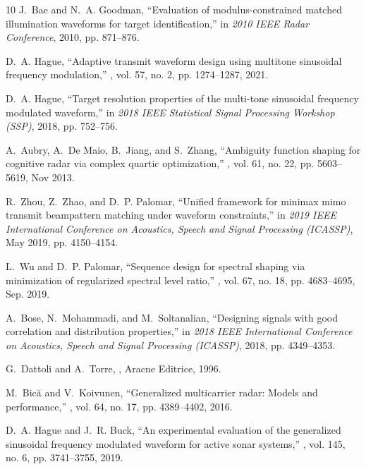 \documentclass{article}
\begin{document}
\begin{thebibliography}{10}
J.~{Bae} and N.~A. {Goodman},
\newblock ``Evaluation of modulus-constrained matched illumination waveforms
  for target identification,''
\newblock in {\em 2010 IEEE Radar Conference}, 2010, pp. 871--876.

D.~A. {Hague},
\newblock ``Adaptive transmit waveform design using multitone sinusoidal
  frequency modulation,''
, vol. 57,
  no. 2, pp. 1274--1287, 2021.

D.~A. {Hague},
\newblock ``Target resolution properties of the multi-tone sinusoidal frequency
  modulated waveform,''
\newblock in {\em 2018 IEEE Statistical Signal Processing Workshop (SSP)},
  2018, pp. 752--756.

A.~{Aubry}, A.~{De Maio}, B.~{Jiang}, and S.~{Zhang},
\newblock ``Ambiguity function shaping for cognitive radar via complex quartic
  optimization,''
, vol. 61, no. 22, pp.
  5603--5619, Nov 2013.

R.~{Zhou}, Z.~{Zhao}, and D.~P. {Palomar},
\newblock ``Unified framework for minimax mimo transmit beampattern matching
  under waveform constraints,''
\newblock in {\em 2019 IEEE International Conference on Acoustics, Speech and
  Signal Processing (ICASSP)}, May 2019, pp. 4150--4154.

L.~{Wu} and D.~P. {Palomar},
\newblock ``Sequence design for spectral shaping via minimization of
  regularized spectral level ratio,''
, vol. 67, no. 18, pp.
  4683--4695, Sep. 2019.

A.~{Bose}, N.~{Mohammadi}, and M.~{Soltanalian},
\newblock ``Designing signals with good correlation and distribution
  properties,''
\newblock in {\em 2018 IEEE International Conference on Acoustics, Speech and
  Signal Processing (ICASSP)}, 2018, pp. 4349--4353.

G.~Dattoli and A.~Torre,
,
\newblock Aracne Editrice, 1996.

M.~{Bică} and V.~{Koivunen},
\newblock ``Generalized multicarrier radar: Models and performance,''
, vol. 64, no. 17, pp.
  4389--4402, 2016.

D.~A. Hague and J.~R. Buck,
\newblock ``An experimental evaluation of the generalized sinusoidal frequency
  modulated waveform for active sonar systems,''
, vol. 145, no.
  6, pp. 3741--3755, 2019.


\end{thebibliography}
\end{document}
